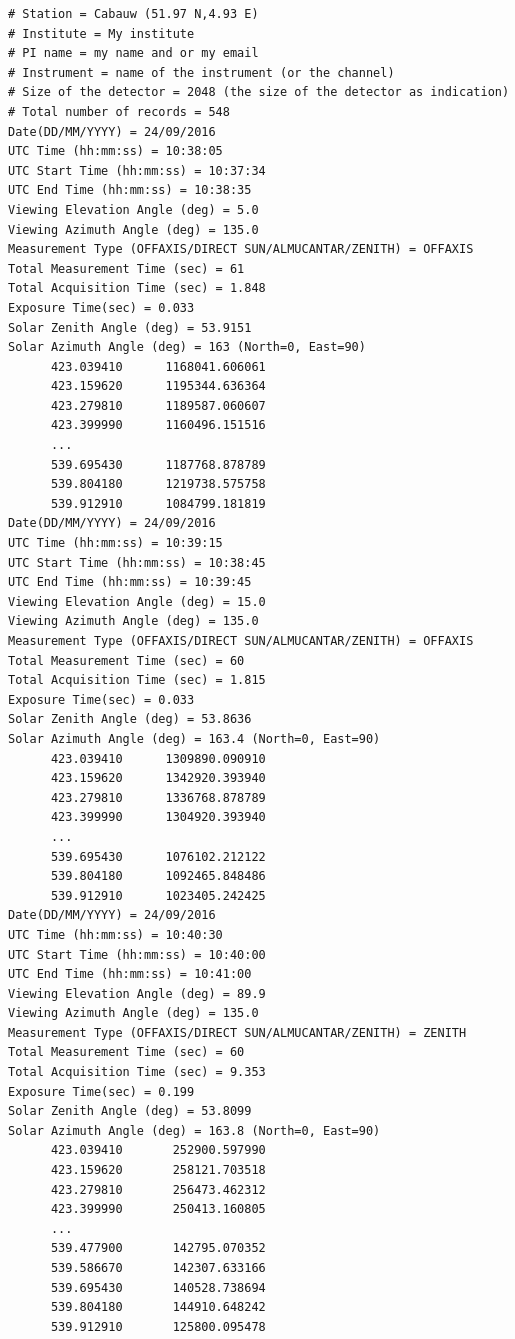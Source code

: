 \begin{Verbatim}[fontfamily=courier,fontsize=\relsize{-2}]
# Station = Cabauw (51.97 N,4.93 E)
# Institute = My institute
# PI name = my name and or my email
# Instrument = name of the instrument (or the channel)
# Size of the detector = 2048 (the size of the detector as indication)
# Total number of records = 548
Date(DD/MM/YYYY) = 24/09/2016
UTC Time (hh:mm:ss) = 10:38:05
UTC Start Time (hh:mm:ss) = 10:37:34
UTC End Time (hh:mm:ss) = 10:38:35
Viewing Elevation Angle (deg) = 5.0
Viewing Azimuth Angle (deg) = 135.0
Measurement Type (OFFAXIS/DIRECT SUN/ALMUCANTAR/ZENITH) = OFFAXIS
Total Measurement Time (sec) = 61
Total Acquisition Time (sec) = 1.848
Exposure Time(sec) = 0.033
Solar Zenith Angle (deg) = 53.9151
Solar Azimuth Angle (deg) = 163 (North=0, East=90)
      423.039410      1168041.606061
      423.159620      1195344.636364
      423.279810      1189587.060607
      423.399990      1160496.151516
      ...
      539.695430      1187768.878789
      539.804180      1219738.575758
      539.912910      1084799.181819
Date(DD/MM/YYYY) = 24/09/2016
UTC Time (hh:mm:ss) = 10:39:15
UTC Start Time (hh:mm:ss) = 10:38:45
UTC End Time (hh:mm:ss) = 10:39:45
Viewing Elevation Angle (deg) = 15.0
Viewing Azimuth Angle (deg) = 135.0
Measurement Type (OFFAXIS/DIRECT SUN/ALMUCANTAR/ZENITH) = OFFAXIS
Total Measurement Time (sec) = 60
Total Acquisition Time (sec) = 1.815
Exposure Time(sec) = 0.033
Solar Zenith Angle (deg) = 53.8636
Solar Azimuth Angle (deg) = 163.4 (North=0, East=90)
      423.039410      1309890.090910
      423.159620      1342920.393940
      423.279810      1336768.878789
      423.399990      1304920.393940
      ...
      539.695430      1076102.212122
      539.804180      1092465.848486
      539.912910      1023405.242425
Date(DD/MM/YYYY) = 24/09/2016
UTC Time (hh:mm:ss) = 10:40:30
UTC Start Time (hh:mm:ss) = 10:40:00
UTC End Time (hh:mm:ss) = 10:41:00
Viewing Elevation Angle (deg) = 89.9
Viewing Azimuth Angle (deg) = 135.0
Measurement Type (OFFAXIS/DIRECT SUN/ALMUCANTAR/ZENITH) = ZENITH
Total Measurement Time (sec) = 60
Total Acquisition Time (sec) = 9.353
Exposure Time(sec) = 0.199
Solar Zenith Angle (deg) = 53.8099
Solar Azimuth Angle (deg) = 163.8 (North=0, East=90)
      423.039410       252900.597990
      423.159620       258121.703518
      423.279810       256473.462312
      423.399990       250413.160805
      ...
      539.477900       142795.070352
      539.586670       142307.633166
      539.695430       140528.738694
      539.804180       144910.648242
      539.912910       125800.095478
\end{Verbatim}

